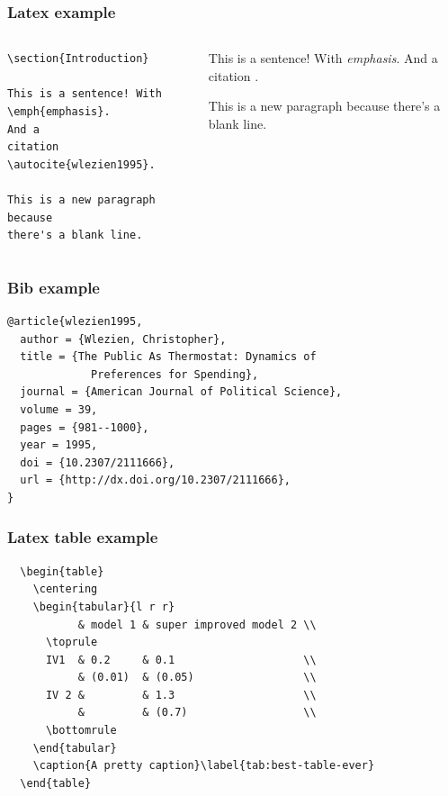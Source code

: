 \documentclass[bigger, aspectratio=169]{beamer}
\begin{document}
\begin{frame}[fragile]
  \frametitle{Latex example}
  \begin{columns}
    \begin{column}{0.5\textwidth}
\begin{verbatim}
\section{Introduction}

This is a sentence! With 
\emph{emphasis}. 
And a 
citation \autocite{wlezien1995}. 

This is a new paragraph because 
there's a blank line. 
\end{verbatim}
    \end{column}
    \begin{column}{0.5\textwidth}
      This is a sentence! With \emph{emphasis}. 
      And a citation \autocite{wlezien1995}. 

      This is a new paragraph because there's a blank line. 
    \end{column}
  \end{columns}
\end{frame}

\begin{frame}[fragile]
  \frametitle{Bib example}
\begin{verbatim}
@article{wlezien1995,
  author = {Wlezien, Christopher},
  title = {The Public As Thermostat: Dynamics of 
             Preferences for Spending},
  journal = {American Journal of Political Science},
  volume = 39,
  pages = {981--1000},
  year = 1995,
  doi = {10.2307/2111666},
  url = {http://dx.doi.org/10.2307/2111666},
}
\end{verbatim}
\end{frame}

\begin{frame}[fragile]
  \frametitle{Latex table example}
\begin{verbatim}
  \begin{table}
    \centering
    \begin{tabular}{l r r}
           & model 1 & super improved model 2 \\
      \toprule
      IV1  & 0.2     & 0.1                    \\
           & (0.01)  & (0.05)                 \\
      IV 2 &         & 1.3                    \\
           &         & (0.7)                  \\
      \bottomrule
    \end{tabular}
    \caption{A pretty caption}\label{tab:best-table-ever}
  \end{table}
\end{verbatim}
\end{frame}
\end{document}
